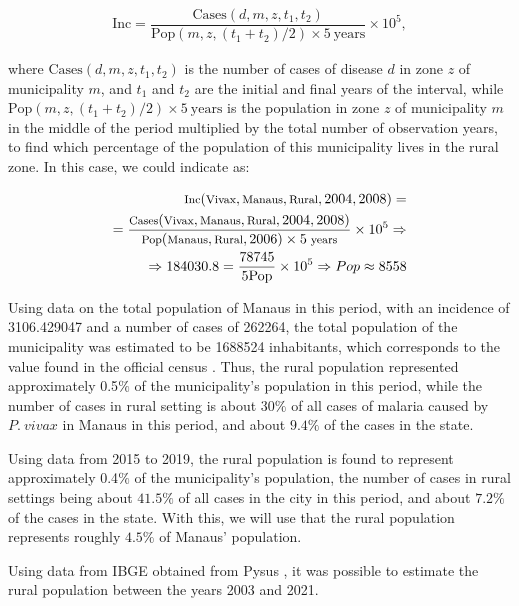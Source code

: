 \documentclass[a4paper,fleqn]{cas-dc}
\begin{document}
\begin{align}
\text{Inc} = %
\dfrac{\text{Cases}(d, m, z, t_1, t_2)}{\text{Pop}(m,z,(t_1+t_2)/2) \times 5 \ \text{years}} \times 10^5,
\end{align}

where $\text{Cases}(d, m, z, t_1, t_2)$ is the number of cases of disease $d$ in zone $z$ of municipality 
$m$, and $t_1$ and $t_2$ are the initial and final years of the interval, while 
$\text{Pop}(m,z,(t_1+t_2)/2) \times 5 \ \text{years}$ is the population in zone $z$ 
of municipality $m$ in the middle of the period multiplied by the total number 
of observation years, to find which percentage of the population of this municipality lives in the rural zone. In this case, we could indicate as:

\begin{align}
    \footnotesize{\text{Inc}(\text{Vivax}, \text{Manaus}, \text{Rural}, 2004, 2008) = } \\
= \footnotesize{\dfrac{\text{Cases}(\text{Vivax}, \text{Manaus}, \text{Rural}, 2004, 2008)}{\text{Pop}(\text{Manaus}, \text{Rural}, 2006) \times 5 \ \text{years}} \times 10^5} \Rightarrow  \\
    \Rightarrow 184030.8 = \dfrac{78745}{5\text{Pop}} \times 10^5 \Rightarrow Pop \approx 8558
\end{align}

Using data on the total population of Manaus in this period, 
with an incidence of 3106.429047 and a number of cases of 262264, the 
total population of the municipality was estimated to be 1688524 
inhabitants, which corresponds to the value found in the official census \cite{Datasus2006}. Thus, the rural population represented 
approximately 0.5$\%$ of the municipality's population in this period, while the number of cases in rural setting is about $30\%$ of all cases of malaria caused by $P. \ vivax$ in Manaus in this 
period, and about $9.4\%$ of the cases in the state.

Using data from 2015 to 2019, the rural population is found to represent  
approximately 0.4$\%$ of the municipality's population, the number of cases in rural settings being about $41.5\%$ of all cases in the city in this 
period, and about $7.2\%$ of the cases in the state. With this, we will use that the rural population represents roughly $4.5\%$ of Manaus' population.

Using data from IBGE obtained from Pysus \cite{Pysus},  %
it was possible to estimate the rural population between the years 2003 and 2021.
\end{document}
